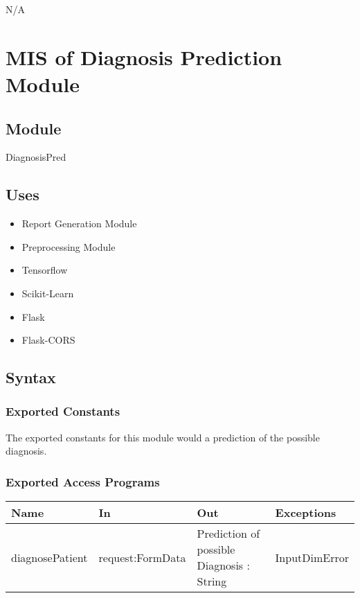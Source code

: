 \documentclass[12pt, titlepage]{article}
\begin{document}
N/A

\newpage

\section{MIS of Diagnosis Prediction Module} \label{diag_pred_mod}

\subsection{Module}

DiagnosisPred

\subsection{Uses}
\begin{itemize}
  \item Report Generation Module
  \item Preprocessing Module
  \item Tensorflow
  \item Scikit-Learn
  \item Flask
  \item Flask-CORS
\end{itemize}

\subsection{Syntax}

\subsubsection{Exported Constants}
The exported constants for this module would a prediction of the possible diagnosis.

\subsubsection{Exported Access Programs}

\begin{center}
\begin{tabular}{p{2cm} p{4cm} p{4cm} p{2cm}}
\hline
\textbf{Name} & \textbf{In} & \textbf{Out} & \textbf{Exceptions} \\
\hline
diagnosePatient & request:FormData & Prediction of possible Diagnosis : String & InputDimError \\
\hline
\end{tabular}
\end{center}
\end{document}
